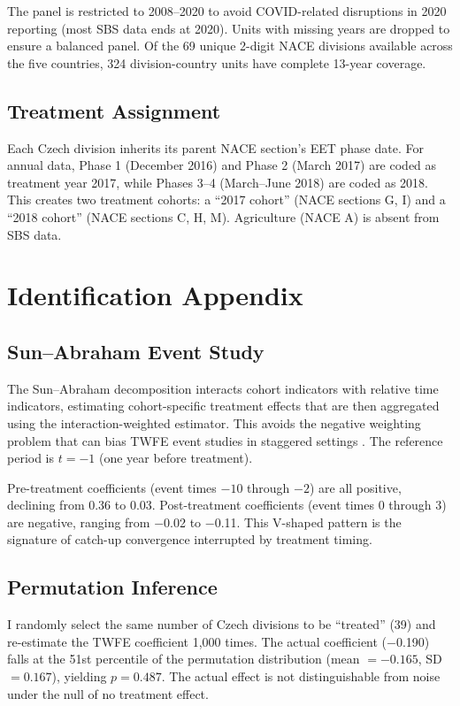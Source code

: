 \documentclass[12pt]{article}
\begin{document}
The panel is restricted to 2008--2020 to avoid COVID-related disruptions in 2020 reporting (most SBS data ends at 2020). Units with missing years are dropped to ensure a balanced panel. Of the 69 unique 2-digit NACE divisions available across the five countries, 324 division-country units have complete 13-year coverage.

\subsection{Treatment Assignment}

Each Czech division inherits its parent NACE section's EET phase date. For annual data, Phase 1 (December 2016) and Phase 2 (March 2017) are coded as treatment year 2017, while Phases 3--4 (March--June 2018) are coded as 2018. This creates two treatment cohorts: a ``2017 cohort'' (NACE sections G, I) and a ``2018 cohort'' (NACE sections C, H, M). Agriculture (NACE A) is absent from SBS data.

\section{Identification Appendix}

\subsection{Sun--Abraham Event Study}

The Sun--Abraham decomposition interacts cohort indicators with relative time indicators, estimating cohort-specific treatment effects that are then aggregated using the interaction-weighted estimator. This avoids the negative weighting problem that can bias TWFE event studies in staggered settings \citep{goodman2021}. The reference period is $t = -1$ (one year before treatment).

Pre-treatment coefficients (event times $-10$ through $-2$) are all positive, declining from 0.36 to 0.03. Post-treatment coefficients (event times 0 through 3) are negative, ranging from $-$0.02 to $-$0.11. This V-shaped pattern is the signature of catch-up convergence interrupted by treatment timing.

\subsection{Permutation Inference}

I randomly select the same number of Czech divisions to be ``treated'' (39) and re-estimate the TWFE coefficient 1,000 times. The actual coefficient ($-$0.190) falls at the 51st percentile of the permutation distribution (mean $= -0.165$, SD $= 0.167$), yielding $p = 0.487$. The actual effect is not distinguishable from noise under the null of no treatment effect.
\end{document}
